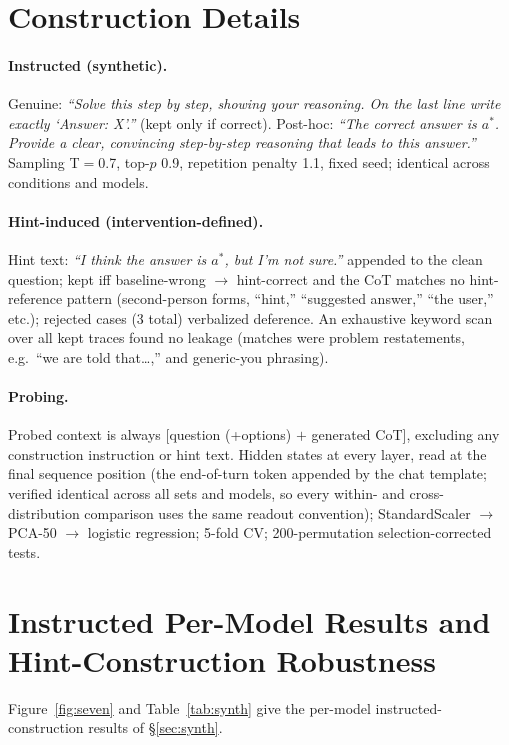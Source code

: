 \documentclass[11pt]{article}
\begin{document}
\section{Construction Details}
\label{app:prompts}
\paragraph{Instructed (synthetic).} Genuine: \emph{``Solve this step by step, showing your reasoning. On the last line write exactly `Answer: X'.''} (kept only if correct). Post-hoc: \emph{``The correct answer is $a^*$. Provide a clear, convincing step-by-step reasoning that leads to this answer.''} Sampling T$=$0.7, top-$p$ 0.9, repetition penalty 1.1, fixed seed; identical across conditions and models.
\paragraph{Hint-induced (intervention-defined).} Hint text: \emph{``I think the answer is $a^*$, but I'm not sure.''} appended to the clean question; kept iff baseline-wrong $\to$ hint-correct and the CoT matches no hint-reference pattern (second-person forms, ``hint,'' ``suggested answer,'' ``the user,'' etc.); rejected cases (3 total) verbalized deference. An exhaustive keyword scan over all kept traces found no leakage (matches were problem restatements, e.g.\ ``we are told that\ldots,'' and generic-you phrasing).
\paragraph{Probing.} Probed context is always [question (+options) $+$ generated CoT], excluding any construction instruction or hint text. Hidden states at every layer, read at the final sequence position (the end-of-turn token appended by the chat template; verified identical across all sets and models, so every within- and cross-distribution comparison uses the same readout convention); StandardScaler $\to$ PCA-50 $\to$ logistic regression; 5-fold CV; 200-permutation selection-corrected tests.

\section{Instructed Per-Model Results and Hint-Construction Robustness}
\label{app:robust}

Figure~\ref{fig:seven} and Table~\ref{tab:synth} give the per-model instructed-construction results of \S\ref{sec:synth}.
\end{document}
